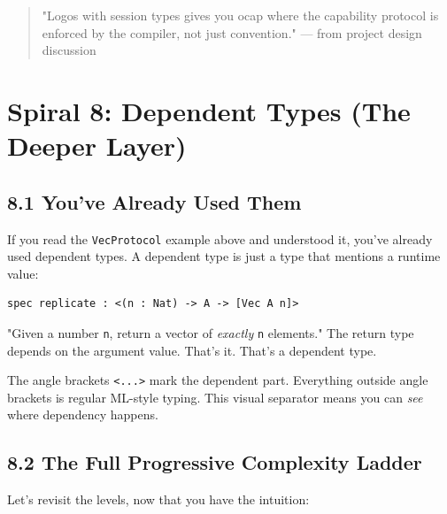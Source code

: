 \documentclass[11pt]{article}
\begin{document}
\begin{quote}
"Logos with session types gives you ocap where the capability protocol
is enforced by the compiler, not just convention."
--- from project design discussion
\end{quote}
\section{Spiral 8: Dependent Types (The Deeper Layer)}
\label{sec:org82d25e6}

\subsection{8.1 You've Already Used Them}
\label{sec:org1f40551}

If you read the \texttt{VecProtocol} example above and understood it, you've
already used dependent types. A dependent type is just a type that
mentions a runtime value:

\begin{verbatim}
spec replicate : <(n : Nat) -> A -> [Vec A n]>
\end{verbatim}

"Given a number \texttt{n}, return a vector of \emph{exactly} \texttt{n} elements." The
return type depends on the argument value. That's it. That's a
dependent type.

The angle brackets \texttt{<...>} mark the dependent part. Everything
outside angle brackets is regular ML-style typing. This visual
separator means you can \emph{see} where dependency happens.
\subsection{8.2 The Full Progressive Complexity Ladder}
\label{sec:org198e29e}

Let's revisit the levels, now that you have the intuition:
\end{document}
